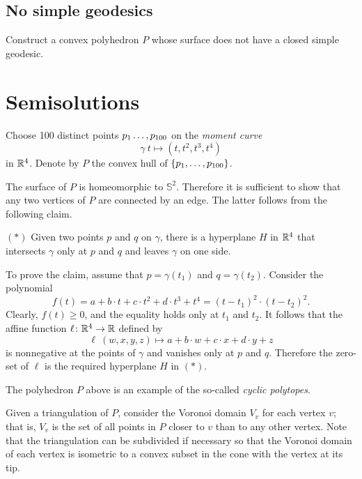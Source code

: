 \subsection*{No simple geodesics\easy}\label{No simple geodesics}

\begin{pr}
Construct a convex polyhedron $P$ whose surface 
does not have a closed simple geodesic.
\end{pr}

\section*{Semisolutions}


Choose 100 distinct points $p_1\z\dots,p_{100}$
on the {}\emph{moment curve} 
\[\gamma\:t\mapsto (t,t^2,t^3,t^4)\] 
in $\mathbb{R}^4$.
Denote by $P$ the convex hull of $\{p_1,\z\dots,p_{100}\}$.

The surface of $P$ is homeomorphic to $\mathbb{S}^2$.
Therefore it is sufficient to show that any two vertices of $P$ are connected by an edge.
The latter follows from the following claim.

\begin{cl}{$({*})$}
Given two points $p$ and $q$ on $\gamma$, there is a hyperplane $H$ in $\mathbb{R}^4$ that intersects $\gamma$ only at $p$ and $q$ and leaves $\gamma$ on one side.
\end{cl}

To prove the claim, assume that $p=\gamma(t_1)$ and $q=\gamma(t_2)$. 
Consider the polynomial
\[f(t)=a+b\cdot t+c\cdot t^2+d\cdot t^3+t^4=(t-t_1)^2\cdot(t-t_2)^2.\]
Clearly, $f(t)\ge 0$, and the equality holds only at $t_1$ and $t_2$.
It follows that the affine function $\ell\colon\mathbb{R}^4\to\mathbb{R}$ defined by 
\[\ell\:(w,x,y,z)\mapsto a+b\cdot w+c\cdot x+d\cdot y+z\]
is nonnegative at the points of $\gamma$ and vanishes only at $p$ and $q$.
Therefore the zero-set of $\ell$ is the required hyperplane $H$ in $({*})$. 
\qeds

The polyhedron $P$ above is an example of the so-called \emph{cyclic polytopes}.

Given a triangulation of $P$,
consider the Voronoi domain $V_v$ for each vertex $v$;
that is, $V_v$ is the set of all points in $P$ closer to $v$ than to any other vertex.
Note that the triangulation can be subdivided if necessary
so that the Voronoi domain of each vertex is isometric to a convex subset in the cone with the vertex at its tip.

